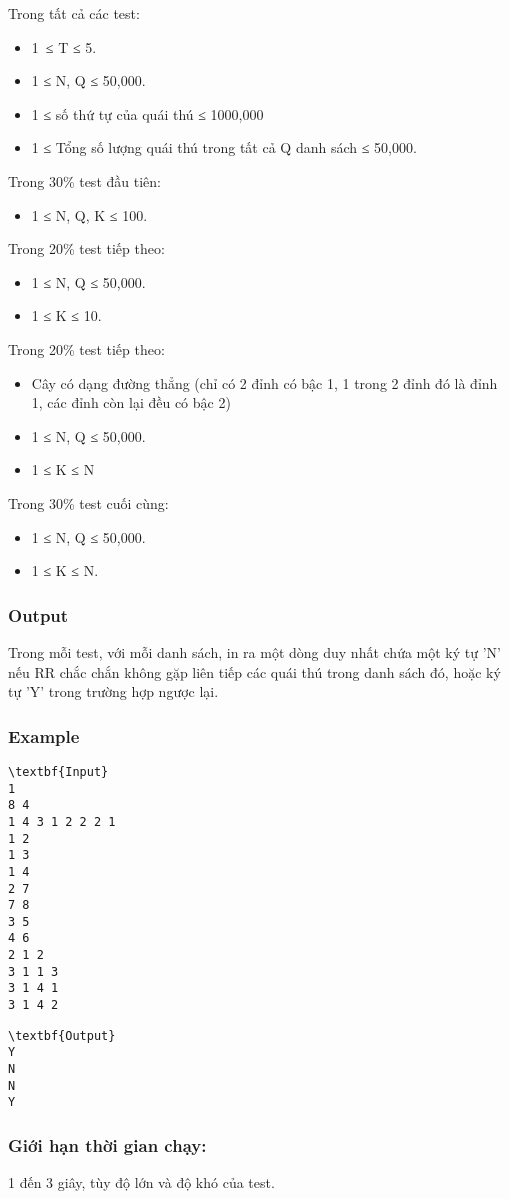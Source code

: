 Trong tất cả các test:
\begin{itemize}
	\item 1 ≤ T ≤ 5.
	\item 1 ≤ N, Q ≤ 50,000.
	\item 1 ≤ số thứ tự của quái thú ≤ 1000,000
	\item 1 ≤ Tổng số lượng quái thú trong tất cả Q danh sách ≤ 50,000.
\end{itemize}

Trong 30\% test đầu tiên:
\begin{itemize}
	\item 1 ≤ N, Q, K ≤ 100.
\end{itemize}

Trong 20\% test tiếp theo:
\begin{itemize}
	\item 1 ≤ N, Q ≤ 50,000.
	\item 1 ≤ K ≤ 10.
\end{itemize}

Trong 20\% test tiếp theo:
\begin{itemize}
	\item Cây có dạng đường thẳng (chỉ có 2 đỉnh có bậc 1, 1 trong 2 đỉnh đó là đỉnh 1, các đỉnh còn lại đều có bậc 2)
	\item 1 ≤ N, Q ≤ 50,000.
	\item 1 ≤ K ≤ N
\end{itemize}

Trong 30\% test cuối cùng:
\begin{itemize}
	\item 1 ≤ N, Q ≤ 50,000.
	\item 1 ≤ K ≤ N.
\end{itemize}

\subsubsection{Output}

Trong mỗi test, với mỗi danh sách, in ra một dòng duy nhất chứa một ký tự 'N' nếu RR chắc chắn không gặp liên tiếp các quái thú trong danh sách đó, hoặc ký tự 'Y' trong trường hợp ngược lại.

\subsubsection{Example}
\begin{verbatim}
\textbf{Input}
1
8 4
1 4 3 1 2 2 2 1
1 2
1 3
1 4
2 7
7 8
3 5
4 6
2 1 2
3 1 1 3
3 1 4 1
3 1 4 2
\end{verbatim}
\begin{verbatim}
\textbf{Output}
Y
N
N
Y
\end{verbatim}

\subsubsection{Giới hạn thời gian chạy:}

1 đến 3 giây, tùy độ lớn và độ khó của test.